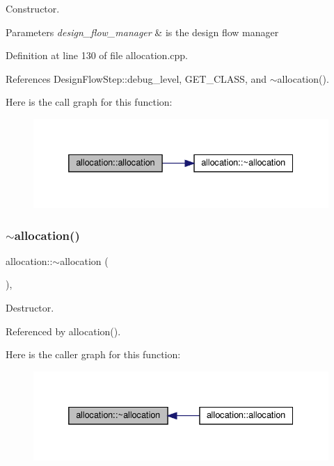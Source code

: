 Constructor. 


\begin{DoxyParams}{Parameters}
{\em design\+\_\+flow\+\_\+manager} & is the design flow manager \\
\hline
\end{DoxyParams}


Definition at line 130 of file allocation.\+cpp.



References Design\+Flow\+Step\+::debug\+\_\+level, G\+E\+T\+\_\+\+C\+L\+A\+SS, and $\sim$allocation().

Here is the call graph for this function\+:
\nopagebreak
\begin{figure}[H]
\begin{center}
\leavevmode
\includegraphics[width=332pt]{d0/d74/classallocation_a28d6121ea2736ac049f433e367683575_cgraph}
\end{center}
\end{figure}
\mbox{\label{classallocation_a6582d417d60e3e09b82147b48004b285}} 
\subsubsection{\texorpdfstring{$\sim$allocation()}{~allocation()}}
{\footnotesize\ttfamily allocation\+::$\sim$allocation (\begin{DoxyParamCaption}{ }\end{DoxyParamCaption})\hspace{0.3cm}{\ttfamily [override]}, {\ttfamily [default]}}



Destructor. 



Referenced by allocation().

Here is the caller graph for this function\+:
\nopagebreak
\begin{figure}[H]
\begin{center}
\leavevmode
\includegraphics[width=332pt]{d0/d74/classallocation_a6582d417d60e3e09b82147b48004b285_icgraph}
\end{center}
\end{figure}


